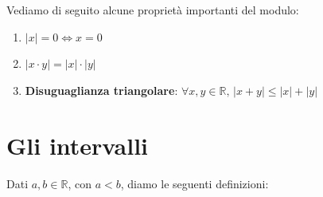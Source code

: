 \documentclass[12pt]{report}
\newcommand{\R}{\mathbb{R}}
\begin{document}
	Vediamo di seguito alcune proprietà importanti del modulo:
	\begin{enumerate}
		
		\item $|x| = 0 \Leftrightarrow x = 0$
		
		\item $|x \cdot y| = |x| \cdot |y|$
		
		\item \textbf{Disuguaglianza triangolare}: $\forall x,y \in \R,\, |x + y| \leq |x| + |y|$
		
	\end{enumerate}
	
	\section{Gli intervalli}
	Dati $a, b \in \R$, con $a < b$, diamo le seguenti definizioni:
\end{document}

